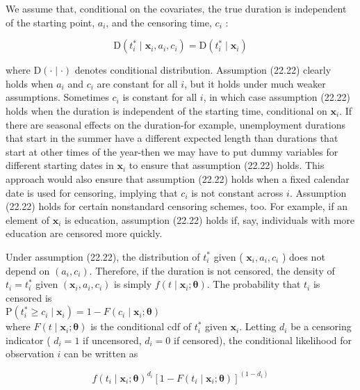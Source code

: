 \documentclass[10pt]{article}
\begin{document}
We assume that, conditional on the covariates, the true duration is independent of the starting point, $a_{i}$, and the censoring time, $c_{i}$ :


\begin{equation*}
\mathrm{D}\left(t_{i}^{*} \mid \mathbf{x}_{i}, a_{i}, c_{i}\right)=\mathrm{D}\left(t_{i}^{*} \mid \mathbf{x}_{i}\right) \tag{22.22}
\end{equation*}


where $\mathrm{D}(\cdot \mid \cdot)$ denotes conditional distribution. Assumption (22.22) clearly holds when $a_{i}$ and $c_{i}$ are constant for all $i$, but it holds under much weaker assumptions. Sometimes $c_{i}$ is constant for all $i$, in which case assumption (22.22) holds when the duration is independent of the starting time, conditional on $\mathbf{x}_{i}$. If there are seasonal effects on the duration-for example, unemployment durations that start in the summer have a different expected length than durations that start at other times of the year-then we may have to put dummy variables for different starting dates in $\mathbf{x}_{i}$ to ensure that assumption (22.22) holds. This approach would also ensure that assumption (22.22) holds when a fixed calendar date is used for censoring, implying that $c_{i}$ is not constant across $i$. Assumption (22.22) holds for certain nonstandard censoring schemes, too. For example, if an element of $\mathbf{x}_{i}$ is education, assumption (22.22) holds if, say, individuals with more education are censored more quickly.

Under assumption (22.22), the distribution of $t_{i}^{*}$ given ( $\mathbf{x}_{i}, a_{i}, c_{i}$ ) does not depend on $\left(a_{i}, c_{i}\right)$. Therefore, if the duration is not censored, the density of $t_{i}=t_{i}^{*}$ given $\left(\mathbf{x}_{i}, a_{i}, c_{i}\right)$ is simply $f\left(t \mid \mathbf{x}_{i} ; \boldsymbol{\theta}\right)$. The probability that $t_{i}$ is censored is\\
$\mathrm{P}\left(t_{i}^{*} \geq c_{i} \mid \mathbf{x}_{i}\right)=1-F\left(c_{i} \mid \mathbf{x}_{i} ; \boldsymbol{\theta}\right)$\\
where $F\left(t \mid \mathbf{x}_{i} ; \boldsymbol{\theta}\right)$ is the conditional cdf of $t_{i}^{*}$ given $\mathbf{x}_{i}$. Letting $d_{i}$ be a censoring indicator ( $d_{i}=1$ if uncensored, $d_{i}=0$ if censored), the conditional likelihood for observation $i$ can be written as


\begin{equation*}
f\left(t_{i} \mid \mathbf{x}_{i} ; \boldsymbol{\theta}\right)^{d_{i}}\left[1-F\left(t_{i} \mid \mathbf{x}_{i} ; \boldsymbol{\theta}\right)\right]^{\left(1-d_{i}\right)} \tag{22.23}
\end{equation*}
\end{document}
